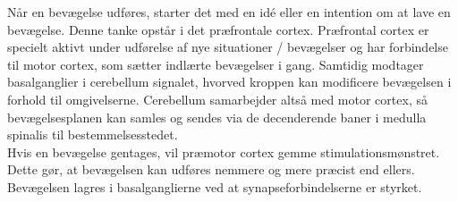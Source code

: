 Når en bevægelse udføres, starter det med en idé eller en intention om at lave en bevægelse. Denne tanke opstår i det præfrontale cortex. Præfrontal cortex er specielt aktivt under udførelse af nye situationer / bevægelser og har forbindelse til motor cortex, som sætter indlærte bevægelser i gang. Samtidig modtager basalganglier i cerebellum signalet, hvorved kroppen kan modificere bevægelsen i forhold til omgivelserne. Cerebellum samarbejder altså med motor cortex, så bevægelsesplanen kan samles og sendes via de decenderende baner i medulla spinalis til bestemmelsesstedet. \cite{Bojsen-Moeller2012} \\
Hvis en bevægelse gentages, vil præmotor cortex gemme stimulationsmønstret. Dette gør, at bevægelsen kan udføres nemmere og mere præcist end ellers. Bevægelsen lagres i basalganglierne ved at synapseforbindelserne er styrket. \cite{Martini2012} 

